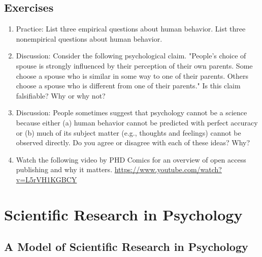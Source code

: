 \subsection{Exercises}
\begin{fullwidth}
\begin{enumerate}
\item Practice: List three empirical questions about human behavior. List three nonempirical questions about human behavior.
\item Discussion: Consider the following psychological claim. "People's choice of spouse is strongly influenced by their perception of their own parents. Some choose a spouse who is similar in some way to one of their parents. Others choose a spouse who is different from one of their parents." Is this claim falsifiable? Why or why not?
\item Discussion: People sometimes suggest that psychology cannot be a science because either (a) human behavior cannot be predicted with perfect accuracy or (b) much of its subject matter (e.g., thoughts and feelings) cannot be observed directly. Do you agree or disagree with each of these ideas? Why?
\item Watch the following video by PHD Comics for an overview of open access publishing and why it matters. \url{https://www.youtube.com/watch?v=L5rVH1KGBCY}
\end{enumerate}
\end{fullwidth}

\newpage
\section{Scientific Research in Psychology}

\subsection{A Model of Scientific Research in Psychology}

